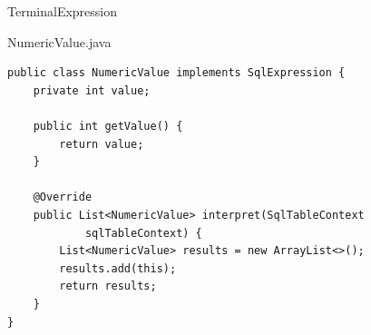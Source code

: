 \begin{frame}[fragile]{TerminalExpression}
	\begin{exampleblock}{NumericValue.java}
 		\begin{lstlisting}
public class NumericValue implements SqlExpression {
	private int value;
	
	public int getValue() {
		return value;
	}

	@Override
	public List<NumericValue> interpret(SqlTableContext 
            sqlTableContext) {
		List<NumericValue> results = new ArrayList<>();
		results.add(this);
		return results;
	}
}
 		\end{lstlisting}
 	\end{exampleblock}
\end{frame}
